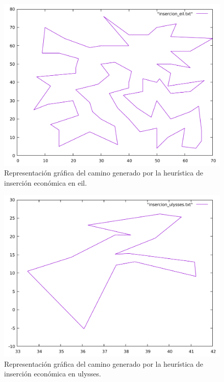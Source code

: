 \begin{figure}[H]
  \centering
  \includegraphics[scale=0.5]{../src/insercion_eil.pdf}
  \caption{Representación gráfica del camino generado por la heurística de inserción económica en eil.}
\end{figure}

\begin{figure}[H]
  \centering
  \includegraphics[scale=0.5]{../src/insercion_ulysses.pdf}
  \caption{Representación gráfica del camino generado por la heurística de inserción económica en ulysses.}
\end{figure} 


